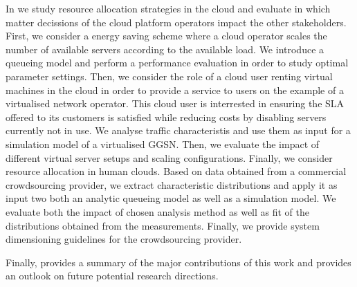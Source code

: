 In  we study resource allocation strategies in the cloud and evaluate in which matter decissions of the cloud platform operators impact the other stakeholders.
First, we consider a energy saving scheme where a cloud operator scales the number of available servers according to the available load.
We introduce a queueing model and perform a performance evaluation in order to study optimal parameter settings.
Then, we consider the role of a cloud user renting virtual machines in the cloud in order to provide a service to users on the example of a virtualised network operator.
This cloud user is interrested in ensuring the \gls{SLA} offered to its customers is satisfied while reducing costs by disabling servers currently not in use.
We analyse traffic characteristis and use them as input for a simulation model of a virtualised \gls{GGSN}.
Then, we evaluate the impact of different virtual server setups and scaling configurations.
Finally, we consider resource allocation in human clouds.
Based on data obtained from a commercial crowdsourcing provider, we extract characteristic distributions and apply it as input two both an analytic queueing model as well as a simulation model.
We evaluate both the impact of chosen analysis method as well as fit of the distributions obtained from the measurements.
Finally, we provide system dimensioning guidelines for the crowdsourcing provider.

Finally,  provides a summary of the major contributions of this work and provides an outlook on future potential research directions.